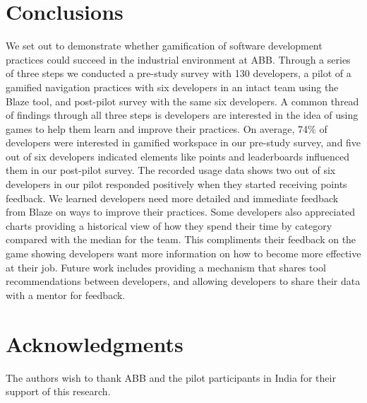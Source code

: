 \documentclass{sig-alternate}
\begin{document}
\section{Conclusions}
We set out to demonstrate whether gamification of software development practices could succeed in the industrial environment at ABB.  Through a series of three steps we conducted a pre-study survey with 130 developers, a pilot of a gamified navigation practices with six developers in an intact team using the Blaze tool, and post-pilot survey with the same six developers.  A common thread of findings through all three steps is developers are interested in the idea of using games to help them learn and improve their practices.  On average, 74\% of developers were interested in gamified workspace in our pre-study survey, and five out of six developers indicated elements like points and leaderboards influenced them in our post-pilot survey.  The recorded usage data shows two out of six developers in our pilot responded positively when they started receiving points feedback.  We learned developers need more detailed and immediate feedback from Blaze on ways to improve their practices.  Some developers also appreciated charts providing a historical view of how they spend their time by category compared with the median for the team.  This compliments their feedback on the game showing developers want more information on how to become more effective at their job.  Future work includes providing a mechanism that shares tool recommendations between developers, and allowing developers to share their data with a mentor for feedback.

\section{Acknowledgments}
The authors wish to thank ABB and the pilot participants in India for their support of this research.

%

\balance
 
%
%
\end{document}
